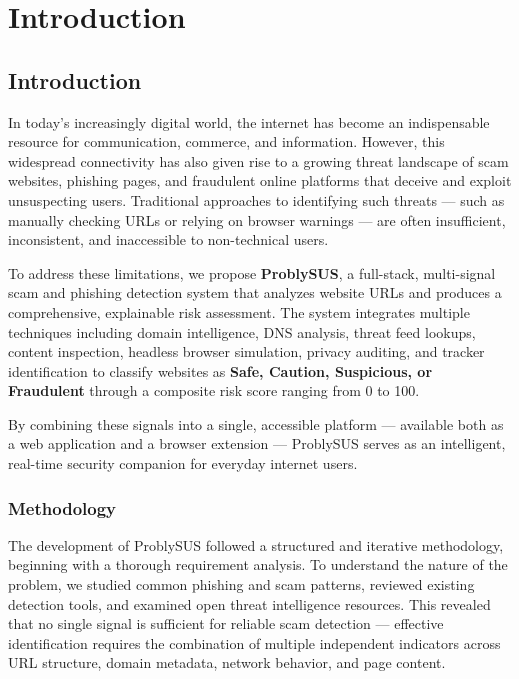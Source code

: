 \chapter{Introduction}
\label{ch:introduction}

\setlength{\parskip}{0.7\baselineskip}

\section{Introduction}

In today's increasingly digital world, the internet has become an indispensable resource for communication, commerce, and information. However, this widespread connectivity has also given rise to a growing threat landscape of scam websites, phishing pages, and fraudulent online platforms that deceive and exploit unsuspecting users. Traditional approaches to identifying such threats — such as manually checking URLs or relying on browser warnings — are often insufficient, inconsistent, and inaccessible to non-technical users.

To address these limitations, we propose \textbf{ProblySUS}, a full-stack, multi-signal scam and phishing detection system that analyzes website URLs and produces a comprehensive, explainable risk assessment. The system integrates multiple techniques including domain intelligence, DNS analysis, threat feed lookups, content inspection, headless browser simulation, privacy auditing, and tracker identification to classify websites as \textbf{Safe, Caution, Suspicious, or Fraudulent} through a composite risk score ranging from 0 to 100.

By combining these signals into a single, accessible platform — available both as a web application and a browser extension — ProblySUS serves as an intelligent, real-time security companion for everyday internet users.

\subsection{Methodology}

The development of ProblySUS followed a structured and iterative methodology, beginning with a thorough requirement analysis. To understand the nature of the problem, we studied common phishing and scam patterns, reviewed existing detection tools, and examined open threat intelligence resources. This revealed that no single signal is sufficient for reliable scam detection — effective identification requires the combination of multiple independent indicators across URL structure, domain metadata, network behavior, and page content.

